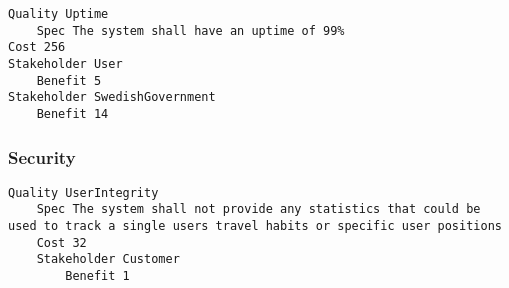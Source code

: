 \begin{lstlisting}
Quality Uptime
	Spec The system shall have an uptime of 99%
Cost 256
Stakeholder User
	Benefit 5
Stakeholder SwedishGovernment
	Benefit 14

\end{lstlisting}
		
				
			 \subsubsection{Security}


\begin{lstlisting}
Quality UserIntegrity
	Spec The system shall not provide any statistics that could be used to track a single users travel habits or specific user positions
	Cost 32
	Stakeholder Customer
		Benefit 1

\end{lstlisting}